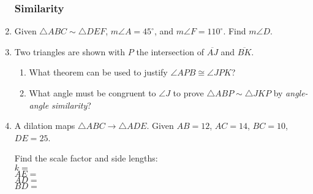 \documentclass[12pt, twoside]{article}
\begin{document}
\begin{enumerate}[itemsep=0.5cm]
\newpage
\subsubsection*{Similarity}
\item Given $\triangle ABC \sim \triangle DEF$, $m\angle A=45^\circ$, and $m\angle F=110^\circ$. Find $m\angle D$. \vspace{4cm}


\item Two triangles are shown with $P$ the intersection of $\overline{AJ}$ and $\overline{BK}$.
\begin{multicols}{2}
  \begin{enumerate}
      \item What theorem can be used to justify $\angle APB \cong \angle JPK$?
      \item What angle must be congruent to $\angle J$ to prove $\triangle ABP \sim \triangle JKP$ by \emph{angle-angle similarity}? \vspace{3cm}
      \end{enumerate}
  \end{multicols}
    \vspace{1cm}

\item A dilation maps $\triangle ABC \rightarrow \triangle ADE$. Given $AB=12$, $AC=14$, $BC=10$, $DE=25$. 
\begin{multicols}{2}
    Find the scale factor and side lengths:\\[0.5cm]
    $k=$\\[1cm]
    $AE=$\\[1cm]
    $AD=$\\[1cm]
    $BD=$\\
    \begin{flushright}
    \end{flushright}
\end{multicols}\vspace{0.25cm}


\end{enumerate}
\end{document}
